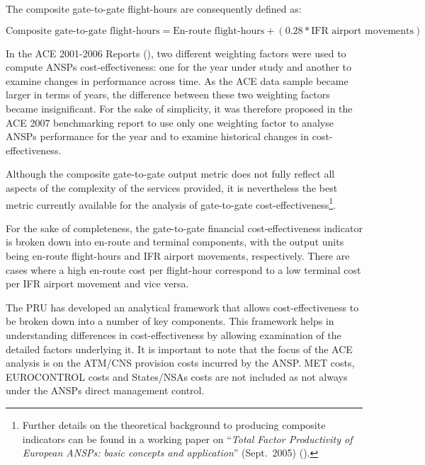 \documentclass[
  11pt,
  a4paperpaper,
  openany,headsepline=on,footsepline=off,DIV=12,table]{scrbook}
\begin{document}
The composite gate-to-gate flight-hours are consequently defined as:

\[ \textrm{Composite gate-to-gate flight-hours} = \textrm{En-route flight-hours} + (0.28 * \textrm{IFR airport movements}) \]

In the ACE 2001-2006 Reports (), two different weighting factors were used to compute
ANSPs cost-effectiveness: one for the year under study and another to
examine changes in performance across time. As the ACE data sample
became larger in terms of years, the difference between these two
weighting factors became insignificant. For the sake of simplicity, it
was therefore proposed in the ACE 2007 benchmarking report to use only
one weighting factor to analyse ANSPs performance for the year and to
examine historical changes in cost-effectiveness.

Although the composite gate-to-gate output metric does not fully reflect
all aspects of the complexity of the services provided, it is
nevertheless the best metric currently available for the analysis of
gate-to-gate cost-effectiveness\footnote{Further details on the
  theoretical background to producing composite indicators can be found
  in a working paper on ``\emph{Total Factor Productivity of European
  ANSPs: basic concepts and application}'' (Sept.~2005)
  ().}.

For the sake of completeness, the gate-to-gate financial
cost-effectiveness indicator is broken down into en-route and terminal
components, with the output units being en-route flight-hours and IFR
airport movements, respectively. There are cases where a high en-route
cost per flight-hour correspond to a low terminal cost per IFR airport
movement and vice versa.

The PRU has developed an analytical framework that allows
cost-effectiveness to be broken down into a number of key components.
This framework helps in understanding differences in cost-effectiveness
by allowing examination of the detailed factors underlying it. It is
important to note that the focus of the ACE analysis is on the ATM/CNS
provision costs incurred by the ANSP. MET costs, EUROCONTROL costs and
States/NSAs costs are not included as not always under the ANSPs direct
management control.
\end{document}
